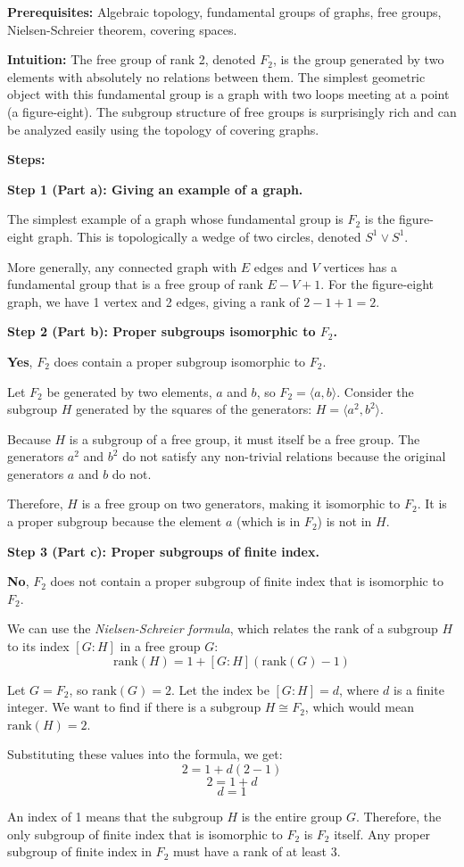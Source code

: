 \begin{solution}
\textbf{Prerequisites:} Algebraic topology, fundamental groups of graphs, free groups, Nielsen-Schreier theorem, covering spaces.

\textbf{Intuition:} The free group of rank 2, denoted $F_2$, is the group generated by two elements with absolutely no relations between them. The simplest geometric object with this fundamental group is a graph with two loops meeting at a point (a figure-eight). The subgroup structure of free groups is surprisingly rich and can be analyzed easily using the topology of covering graphs.

\textbf{Steps:}

\textbf{Step 1 (Part a): Giving an example of a graph.}

The simplest example of a graph whose fundamental group is $F_2$ is the figure-eight graph. This is topologically a wedge of two circles, denoted $S^1 \vee S^1$.

More generally, any connected graph with $E$ edges and $V$ vertices has a fundamental group that is a free group of rank $E - V + 1$. For the figure-eight graph, we have 1 vertex and 2 edges, giving a rank of $2 - 1 + 1 = 2$.

\textbf{Step 2 (Part b): Proper subgroups isomorphic to $F_2$.}

\textbf{Yes}, $F_2$ does contain a proper subgroup isomorphic to $F_2$.

Let $F_2$ be generated by two elements, $a$ and $b$, so $F_2 = \langle a, b \rangle$. Consider the subgroup $H$ generated by the squares of the generators: $H = \langle a^2, b^2 \rangle$.

Because $H$ is a subgroup of a free group, it must itself be a free group. The generators $a^2$ and $b^2$ do not satisfy any non-trivial relations because the original generators $a$ and $b$ do not.

Therefore, $H$ is a free group on two generators, making it isomorphic to $F_2$. It is a proper subgroup because the element $a$ (which is in $F_2$) is not in $H$.

\textbf{Step 3 (Part c): Proper subgroups of finite index.}

\textbf{No}, $F_2$ does not contain a proper subgroup of finite index that is isomorphic to $F_2$.

We can use the \textit{Nielsen-Schreier formula}, which relates the rank of a subgroup $H$ to its index $[G:H]$ in a free group $G$:
\[ \text{rank}(H) = 1 + [G:H](\text{rank}(G) - 1) \]

Let $G = F_2$, so $\text{rank}(G) = 2$. Let the index be $[G:H] = d$, where $d$ is a finite integer. We want to find if there is a subgroup $H \cong F_2$, which would mean $\text{rank}(H) = 2$.

Substituting these values into the formula, we get:
\[ 2 = 1 + d(2 - 1) \]
\[ 2 = 1 + d \]
\[ d = 1 \]

An index of 1 means that the subgroup $H$ is the entire group $G$. Therefore, the only subgroup of finite index that is isomorphic to $F_2$ is $F_2$ itself. Any proper subgroup of finite index in $F_2$ must have a rank of at least 3.
\end{solution}
